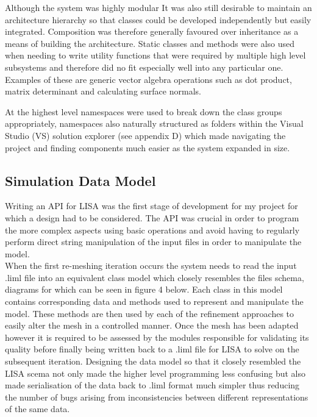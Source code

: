 \noindent
Although the system was highly modular It was also still desirable to maintain an architecture hierarchy so that classes could be developed independently but easily integrated. Composition was therefore generally favoured over inheritance as a means of building the architecture. Static classes and methods were also used when needing to write utility functions that were required by multiple high level subsystems and therefore did no fit especially well into any particular one. Examples of these are generic vector algebra operations such as dot product, matrix determinant and calculating surface normals.

\noindent
At the highest level namespaces were used to break down the class groups appropriately, namespaces also naturally structured as folders within the Visual Studio (VS) solution explorer (see appendix D) which made navigating the project and finding components much easier as the system expanded in size.



\subsection{Simulation Data Model}
Writing an API for LISA was the first stage of development for my project for which a design had to be considered. The API was crucial in order to program the more complex aspects using basic operations and avoid having to regularly perform direct string manipulation of the input files in order to manipulate the model. \\

\noindent
When the first re-meshing iteration occurs the system needs to read the input .liml file into an equivalent class model which closely resembles the files schema, diagrams for which can be seen in figure 4 below. Each class in this model contains corresponding data and methods used to represent and manipulate the model. These methods are then used by each of the refinement approaches to easily alter the mesh in a controlled manner. Once the mesh  has been adapted however it is required to be assessed by the modules responsible for validating its quality before finally being written back to a .liml file for LISA to solve on the subsequent iteration. Designing the data model so that it closely resembled the LISA scema not only made the higher level programming less confusing but also made serialisation of the data back to .liml format much simpler  thus reducing the number of bugs arising from inconsistencies between different representations of the same data. \\

